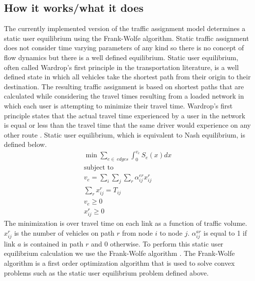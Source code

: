 \subsection{How it works/what it does}
The currently implemented version of the traffic assignment model determines a static user equilibrium using the Frank-Wolfe algorithm. Static traffic assignment does not consider time varying parameters of any kind so there is no concept of flow dynamics but there is a well defined equilibrium. Static user equilibrium, often called Wardrop’s first principle in the transportation literature, is a well defined state in which all vehicles take the shortest path from their origin to their destination. The resulting traffic assignment is based on shortest paths that are calculated while considering the travel times resulting from a loaded network in which each user is attempting to minimize their travel time. 
Wardrop's first principle states that the actual travel time experienced by a user in the network is equal or less than the travel time that the same driver would experience on any other route \cite{wardrop1952road}. Static user equilibrium, which is equivalent to Nash equilibrium, is defined below.
\begin{equation}
\begin{split}
\min \sum_{e\in\ \textit{edges}}\int_{0}^{v_e} S_e(x) dx\\
\text{subject to} \\ 
v_e = \sum_i \sum_j \sum_r \alpha_{ij}^{er} x_{ij}^{r}\\
\sum_r x_{ij}^{r} = T_{ij}\\
v_e \geq 0 \\
x_{ij}^{r} \geq 0
\end{split}
\end{equation}
The minimization is over travel time on each link as a function of traffic volume. $x_{ij}^{r}$ is the number of vehicles on path $r$ from node $i$ to node $j$. $\alpha_{ij}^{ar}$ is equal to 1 if link $a$ is contained in path $r$ and 0 otherwise.  To perform this static user equilibrium calculation we use the Frank-Wolfe algorithm \cite{frank1956algorithm}. The Frank-Wolfe algorithm is a first order optimization algorithm that is used to solve convex problems such as the static user equilibrium problem defined above.


